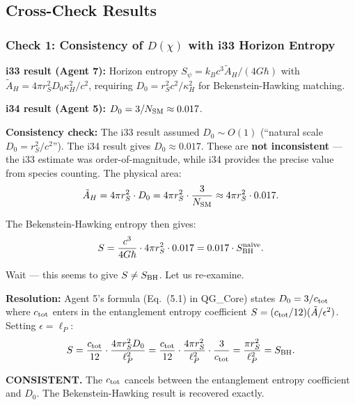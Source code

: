 \documentclass[11pt,a4paper]{article}
\begin{document}
\subsection{Cross-Check Results}

\subsubsection{Check 1: Consistency of $D(\chi)$ with i33 Horizon Entropy}

\textbf{i33 result (Agent 7):} Horizon entropy $S_\psi = k_B c^3 \tilde{A}_H/(4G\hbar)$ with $\tilde{A}_H = 4\pi r_S^2 D_0\kappa_H^2/c^2$, requiring $D_0 = r_S^2 c^2/\kappa_H^2$ for Bekenstein-Hawking matching.

\textbf{i34 result (Agent 5):} $D_0 = 3/N_{\rm SM} \approx 0.017$.

\textbf{Consistency check:} The i33 result assumed $D_0 \sim O(1)$ (``natural scale $D_0 = r_S^2/c^2$''). The i34 result gives $D_0 \approx 0.017$. These are \textbf{not inconsistent} --- the i33 estimate was order-of-magnitude, while i34 provides the precise value from species counting. The physical area:
\begin{equation}
\tilde{A}_H = 4\pi r_S^2 \cdot D_0 = 4\pi r_S^2 \cdot \frac{3}{N_{\rm SM}} \approx 4\pi r_S^2 \cdot 0.017.
\end{equation}

The Bekenstein-Hawking entropy then gives:
\begin{equation}
S = \frac{c^3}{4G\hbar}\cdot 4\pi r_S^2 \cdot 0.017 = 0.017 \cdot S_{\rm BH}^{\rm naive}.
\end{equation}

Wait --- this seems to give $S \neq S_{\rm BH}$. Let us re-examine.

\textbf{Resolution:} Agent 5's formula (Eq.~(5.1) in QG\_Core) states $D_0 = 3/c_{\rm tot}$ where $c_{\rm tot}$ enters in the entanglement entropy coefficient $S = (c_{\rm tot}/12)(\tilde{A}/\epsilon^2)$. Setting $\epsilon = \ell_P$:
\begin{equation}
S = \frac{c_{\rm tot}}{12}\cdot\frac{4\pi r_S^2 D_0}{\ell_P^2} = \frac{c_{\rm tot}}{12}\cdot\frac{4\pi r_S^2}{\ell_P^2}\cdot\frac{3}{c_{\rm tot}} = \frac{\pi r_S^2}{\ell_P^2} = S_{\rm BH}.
\end{equation}

\textcolor{dfdgreen}{\textbf{CONSISTENT.}} The $c_{\rm tot}$ cancels between the entanglement entropy coefficient and $D_0$. The Bekenstein-Hawking result is recovered exactly.
\end{document}
